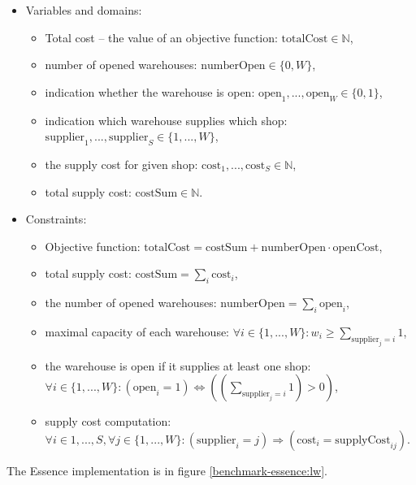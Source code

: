 	\begin{itemize}
  \item Variables and domains:
    \begin{itemize}
      \item Total cost -- the value of an objective function: $\mathrm{totalCost} \in \mathbb{N} $,
      \item number of opened warehouses: $\mathrm{numberOpen} \in \{0, W\}$,
      \item indication whether the warehouse is open: $\mathrm{open}_1, ..., \mathrm{open}_{W} \in \{0, 1\}$,
      \item indication which warehouse supplies which shop: $\mathrm{supplier}_1, ..., \mathrm{supplier}_{S} \in \{1, ..., W\}$,
      \item the supply cost for given shop: $\mathrm{cost}_1, ..., \mathrm{cost}_{S} \in \mathbb{N}$,
      \item total supply cost: $\mathrm{costSum} \in \mathbb{N}$.
    \end{itemize} 
	\item Constraints:
  	\begin{itemize}
  	 \item Objective function: $\mathrm{totalCost} = \mathrm{costSum} + \mathrm{numberOpen} \cdot \mathrm{openCost}$,
  	 \item total supply cost: $\mathrm{costSum} = \sum_i{\mathrm{cost}_i}$,
  	 \item the number of opened warehouses: $\mathrm{numberOpen} = \sum_i{\mathrm{open}_i}$,
  	 \item maximal capacity of each warehouse: $\forall i \in \{1,...,W\}: w_i \geq \sum_{\mathrm{supplier}_j = i}{1}$,
  	 \item the warehouse is open if it supplies at least one shop: $\forall i \in \{1,...,W\}: \left(\mathrm{open}_i = 1\right) \Leftrightarrow \left(\left(\sum_{\mathrm{supplier}_j = i}{1}\right) > 0\right)$,
  	 \item supply cost computation: $\forall i \in {1,...,S}, \forall j \in \{1,...,W\}: \left(\mathrm{supplier}_i = j\right) \Rightarrow \left(\mathrm{cost}_i = \mathrm{supplyCost}_{ij} \right)$.
     
    \end{itemize}
  \end{itemize} 
The Essence implementation is in figure \ref{benchmark-essence:lw}.

